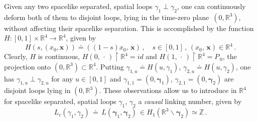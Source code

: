 \documentclass[11pt]{article}
\numberwithin{equation}{section}
\newcommand{\RR}{{\mathbb R}}
\newcommand{\ZZ}{{\mathbb Z}}
\newcommand{\bgamma}{{\bm \gamma}}
\newcommand{\bix}{{\bm x}}
\begin{document}
\medskip 
Given any two spacelike separated,  
spatial loops $\gamma_1 \perp \gamma_2$, one can continuously deform 
both of them to disjoint loops, lying in the 
time-zero plane~$(0,\RR^3)$, without affecting their 
spacelike separation. This is accomplished by the function 
$H: [0,1] \times \RR^4 \rightarrow \RR^4$, given by 
$$
H(s,(x_0,\bix)) \doteq ((1-s)x_0,\,\bix) 
\, , \quad s\in[0,1] \, , \, 
(x_0,\,\bix) \in \RR^4 \, . 
$$
Clearly, $H$ is continuous, 
$H(0,\, \cdot \,) \upharpoonright \RR^4 
= id$ and 
$H(1,\, \cdot \,) \upharpoonright \RR^4
= P_{\, 0}$, the projection onto $(0,\RR^3) \subset \RR^4$. Putting 
$\gamma_{1,u} \doteq H(u,\gamma_1)$, $\gamma_{2,u} \doteq H(u,\gamma_2)$, 
one has $\gamma_{1,u} \perp \gamma_{2,u}$ for any $u \in [0,1]$ and
$\gamma_{1,1} = (0, \bgamma_1)$, $\gamma_{2,1} = (0, \bgamma_2)$
are disjoint loops lying in $(0, \RR^3)$.  
These observations allow us to introduce 
in $\RR^4$ for spacelike separated,
spatial loops $\gamma_1$, $\gamma_2$ 
a \textit{causal} linking number, given by
%
\begin{equation}
\label{linking}
L_c(\gamma_1,\gamma_2) \, \doteq \, 
L(\bgamma_1, \bgamma_2) \, \in H_1(\RR^3 \backslash \bgamma_2) \simeq \ZZ \, .
\end{equation}
%
\end{document}
